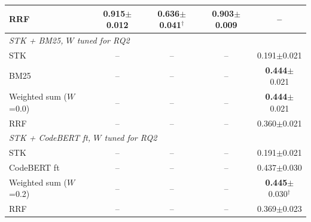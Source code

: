 \begin{table}[!htbp]
\begin{tabular}{lcccc}
\quad RRF & 0.915$\pm$0.012 & 0.636$\pm$0.041$^{\dagger}$ & 0.903$\pm$0.009 & -- \\
\midrule
\multicolumn{5}{l}{\emph{STK + BM25, $W$ tuned for RQ2}} \\
\quad STK & -- & -- & -- & 0.191$\pm$0.021 \\
\quad BM25 & -- & -- & -- & \textbf{0.444}$\pm$0.021 \\
\quad Weighted sum ($W$=0.0) & -- & -- & -- & \textbf{0.444}$\pm$0.021 \\
\quad RRF & -- & -- & -- & 0.360$\pm$0.021 \\
\midrule
\multicolumn{5}{l}{\emph{STK + CodeBERT ft, $W$ tuned for RQ2}} \\
\quad STK & -- & -- & -- & 0.191$\pm$0.021 \\
\quad CodeBERT ft & -- & -- & -- & 0.437$\pm$0.030 \\
\quad Weighted sum ($W$=0.2) & -- & -- & -- & \textbf{0.445}$\pm$0.030$^{\dagger}$ \\
\quad RRF & -- & -- & -- & 0.369$\pm$0.023 \\
\bottomrule
\end{tabular}
\end{table}
